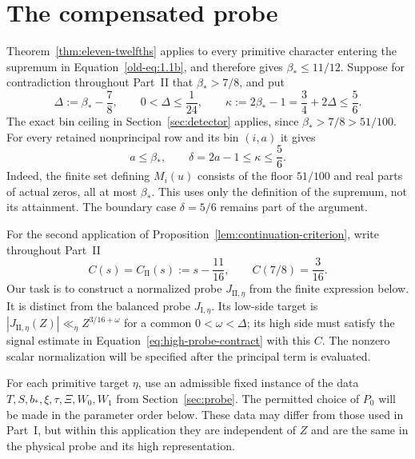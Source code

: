 \documentclass[11pt,a4paper]{article}
\numberwithin{equation}{section}
\numberwithin{figure}{section}
\theoremstyle{definition}
\theoremstyle{remark}
\begin{document}
\section{The compensated probe}\label{sec:compensation}

Theorem~\ref{thm:eleven-twelfths} applies to every primitive character
entering the supremum in Equation~\eqref{old-eq:1.1b}, and therefore gives
$\beta_*\le11/12$.  Suppose for contradiction throughout Part~II that
$\beta_*>7/8$, and put
\begin{equation}\label{eq:part-II-bootstrap}
 \Delta:=\beta_*-\frac78,\qquad 0<\Delta\le\frac1{24},
 \qquad
 \kappa:=2\beta_*-1=\frac34+2\Delta\le\frac56.
\end{equation}
The exact bin ceiling in Section~\ref{sec:detector} applies, since
$\beta_*>7/8>51/100$.  For every retained nonprincipal row and its bin
$(i,a)$ it gives
\begin{equation}\label{eq:part-II-bin-ceiling}
 a\le\beta_*,\qquad \delta=2a-1\le\kappa\le\frac56.
\end{equation}
Indeed, the finite set defining $M_i(u)$ consists of the floor $51/100$ and
real parts of actual zeros, all at most $\beta_*$.  This uses only the
definition of the supremum, not its attainment.  The boundary case
$\delta=5/6$ remains part of the argument.

For the second application of Proposition~\ref{lem:continuation-criterion},
write throughout Part~II
\begin{equation}\label{eq:part-II-mellin-target}
 C(s)=C_{\mathrm{II}}(s):=s-\frac{11}{16},\qquad
 C(7/8)=\frac3{16}.
\end{equation}
Our task is to construct a normalized probe $J_{\mathrm{II},\eta}$ from
the finite expression below.  It is distinct from the balanced probe
$J_{\mathrm I,\eta}$.  Its low-side target is
$|J_{\mathrm{II},\eta}(Z)|\ll_\eta Z^{3/16+\omega}$ for a common
$0<\omega<\Delta$; its high side must satisfy the signal estimate in
Equation~\eqref{eq:high-probe-contract} with this $C$.  The nonzero scalar
normalization will be specified after the principal term is evaluated.

For each primitive target $\eta$, use an admissible fixed instance of the
data $T,S,b_*,\xi,\tau,\Xi,W_0,W_1$ from Section~\ref{sec:probe}.  The
permitted choice of $P_0$ will be made in the parameter order below.  These
data may differ from those used in Part~I, but within this application they
are independent of $Z$ and are the same in the physical probe and its high
representation.
\end{document}
